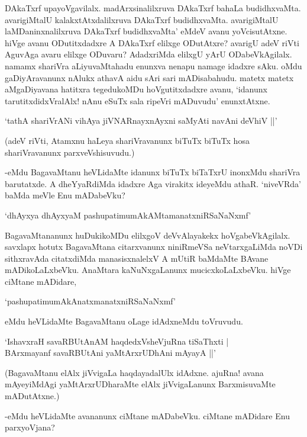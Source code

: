 DAkaTxrf upayoVgavilalx. madArxsinalilxruva DAkaTxrf bahaLa budidhxvaMta. avarigiMtalU kalakxtAtxdalilxruva DAkaTxrf budidhxvaMta. avarigiMtalU laMDaninxnalilxruva DAkaTxrf budidhxvaMta' eMdeV avanu yoVcisutAtxne. hiVge avanu ODutitxdadxre A DAkaTxrf elilxge ODutAtxre? avarigU adeV riVti AguvAga avaru elilxge ODuvaru? AdadxriMda elilxgU yArU ODabeVkAgilalx. namamx shariVra aLiyuvaMtahadu enunxva nenapu namage idadxre sAku. oMdu gaDiyAravanunx nAlukx athavA aidu sAri sari mADisabahudu. matetx matetx aMgaDiyavana hatitxra tegedukoMDu hoVgutitxdadxre avanu, `idanunx tarutitxdidxVralAlx! nAnu eSuTx sala ripeVri mADuvudu' enunxtAtxne.

\begin{shloka}
`tathA shariVrANi vihAya jiVNARnayxnAyxni saMyAti navAni deVhiV ||'
\end{shloka}

(adeV riVti, Atamxnu haLeya shariVravanunx biTuTx biTuTx hosa shariVravanunx parxveVshisuvudu.)


-eMdu BagavaMtanu heVLidaMte idanunx biTuTx biTaTxrU inonxMdu shariVra barutatxde. A dheYyaRdiMda idadxre Aga virakitx ideyeMdu athaR. `niveVRda' baMda meVle Enu mADabeVku?

\begin{shloka}
`dhAyxya dhAyxyaM pashupatimumAkAMtamanatxniRSaNaNxmf'
\end{shloka}

BagavaMtananunx huDukikoMDu elilxgoV deVvAlayakekx hoVgabeVkAgilalx. savxlapx hotutx BagavaMtana citarxvanunx niniRmeVSa neVtarxgaLiMda noVDi sithxravAda citatxdiMda manasisxnalelxV A mUtiR baMdaMte BAvane mADikoLaLxbeVku. AnaMtara kaNuNxgaLanunx mucicxkoLaLxbeVku. hiVge ciMtane mADidare,

\begin{shloka}
`pashupatimumAkAnatxmanatxniRSaNaNxmf'
\end{shloka}

eMdu heVLidaMte BagavaMtanu oLage idAdxneMdu toVruvudu.

\begin{shloka}
`IshavxraH savaRBUtAnAM haqdedxVsheVjuRna tiSaThxti |\\
BArxmayanf savaRBUtAni yaMtArxrUDhAni mAyayA ||'
\end{shloka}

(BagavaMtanu elAlx jiVvigaLa haqdayadalUlx idAdxne. ajuRna! avana mAyeyiMdAgi yaMtArxrUDharaMte elAlx jiVvigaLanunx BarxmisuvaMte mADutAtxne.)

-eMdu heVLidaMte avananunx ciMtane mADabeVku. ciMtane mADidare Enu parxyoVjana?

